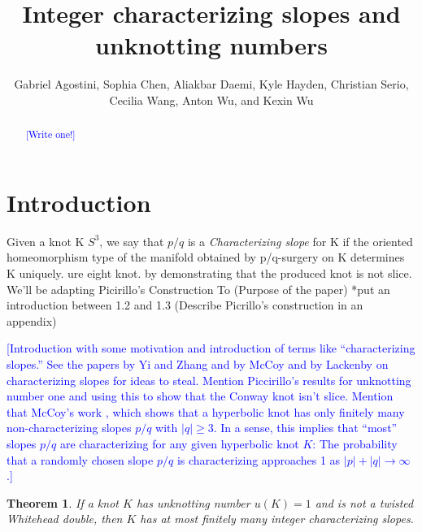 \documentclass[11pt,usenames,dvipsnames,reqno]{amsart}
\newtheorem{theorem}{Theorem}
\numberwithin{theorem}{section}
\theoremstyle{ex}
\theoremstyle{rem}
\def\kh#1{\textcolor{Blue}{#1}}
\begin{document}


\title{Integer characterizing slopes and unknotting numbers}

\author[Agostini, Chen, Daemi, Hayden, Serio, Wang, A. Wu, and K. Wu]{Gabriel Agostini, Sophia Chen, Aliakbar Daemi, Kyle Hayden, Christian Serio, Cecilia Wang, Anton Wu, and Kexin Wu}



\begin{abstract} 
\kh{[Write one!]}
\end{abstract}


\maketitle

\section{Introduction}\label{sec:intro}

Given a knot K $S^3$, we say that $p/q$  is a {\it Characterizing slope} for K  if the oriented homeomorphism type of the manifold obtained by p/q-surgery on K determines K uniquely. 
ure eight knot. 
 by demonstrating that the produced knot is not slice. We’ll be adapting Picirillo’s Construction To (Purpose of the paper)
*put an introduction between 1.2 and 1.3 
(Describe Picrillo’s construction in an appendix) 


\kh{[Introduction with some motivation and introduction of terms like ``characterizing slopes.'' See the papers by Yi and Zhang and by McCoy and by Lackenby on characterizing slopes for ideas to steal. Mention Piccirillo's results for unknotting number one and using this to show that the Conway knot isn't slice. Mention that McCoy's work \cite{mccoy:hyperbolic}, which shows that a hyperbolic knot has only finitely many non-characterizing slopes $p/q$ with $|q| \geq 3$. In a sense, this implies that ``most'' slopes $p/q$ are characterizing for any given hyperbolic knot $K$: The  probability that a randomly chosen slope $p/q$ is characterizing approaches 1 as $|p|+|q|\to \infty$.]}

\begin{theorem}\label{thm:unknotting-one} If a knot $K$ has unknotting number $u(K)=1$ and is not a twisted Whitehead double, then $K$ has at most finitely many integer characterizing slopes.
\end{theorem}
\end{document}
